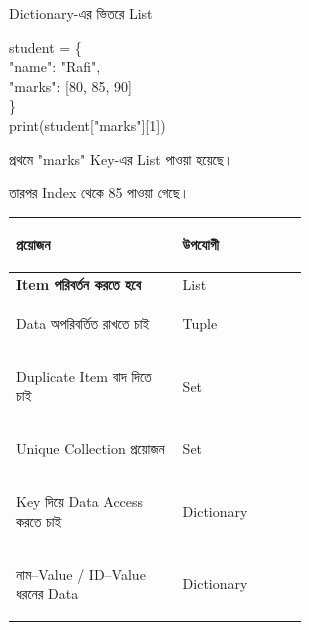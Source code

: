 \begin{codeoutputbox}{Dictionary-এর ভিতরে List}

\noindent
\begin{minipage}[t]{0.56\linewidth}
\codeheading

\begin{english}
\ttfamily
student = \{\\
\hspace*{4mm}"name": "Rafi",\\
\hspace*{4mm}"marks": [80, 85, 90]\\
\}\\
print(student["marks"][1])
\end{english}

\end{minipage}
\hfill
\begin{minipage}[t]{0.40\linewidth}
\outputheading

\begin{center}
\textenglish{}
\end{center}

প্রথমে
\textenglish{\ttfamily "marks"}
Key-এর List পাওয়া হয়েছে।

তারপর Index
\textenglish{}
থেকে 85 পাওয়া গেছে।

\end{minipage}

\end{codeoutputbox}




\begin{tabularx}
{\linewidth}
{
|>{\bfseries\RaggedRight\arraybackslash}p{0.58\linewidth}
|Y|
}

\hline
{}

\textbf{প্রয়োজন}
&
\textbf{উপযোগী}
\\
\hline

Item পরিবর্তন করতে হবে
&
List
\\
\hline

Data অপরিবর্তিত রাখতে চাই
&
Tuple
\\
\hline

Duplicate Item বাদ দিতে চাই
&
Set
\\
\hline

Unique Collection প্রয়োজন
&
Set
\\
\hline

Key দিয়ে Data Access করতে চাই
&
Dictionary
\\
\hline

নাম--Value / ID--Value ধরনের Data
&
Dictionary
\\
\hline

\end{tabularx}

